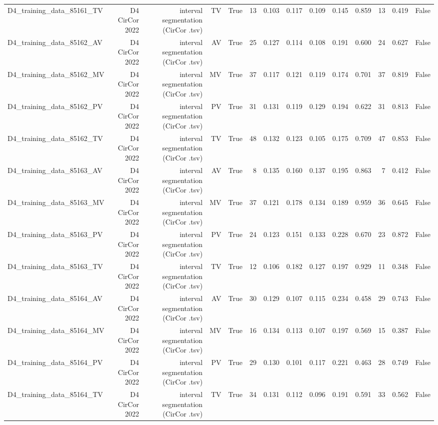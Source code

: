\begin{table}[htbp]
\begin{tabular}{lrrrrrrrrrrrrr}
    D4\_training\_data\_85161\_TV & D4 CirCor 2022 & interval segmentation (CirCor .tsv) & TV & True & 13 & 0.103 & 0.117 & 0.109 & 0.145 & 0.859 & 13 & 0.419 & False \\
    D4\_training\_data\_85162\_AV & D4 CirCor 2022 & interval segmentation (CirCor .tsv) & AV & True & 25 & 0.127 & 0.114 & 0.108 & 0.191 & 0.600 & 24 & 0.627 & False \\
    D4\_training\_data\_85162\_MV & D4 CirCor 2022 & interval segmentation (CirCor .tsv) & MV & True & 37 & 0.117 & 0.121 & 0.119 & 0.174 & 0.701 & 37 & 0.819 & False \\
    D4\_training\_data\_85162\_PV & D4 CirCor 2022 & interval segmentation (CirCor .tsv) & PV & True & 31 & 0.131 & 0.119 & 0.129 & 0.194 & 0.622 & 31 & 0.813 & False \\
    D4\_training\_data\_85162\_TV & D4 CirCor 2022 & interval segmentation (CirCor .tsv) & TV & True & 48 & 0.132 & 0.123 & 0.105 & 0.175 & 0.709 & 47 & 0.853 & False \\
    D4\_training\_data\_85163\_AV & D4 CirCor 2022 & interval segmentation (CirCor .tsv) & AV & True & 8 & 0.135 & 0.160 & 0.137 & 0.195 & 0.863 & 7 & 0.412 & False \\
    D4\_training\_data\_85163\_MV & D4 CirCor 2022 & interval segmentation (CirCor .tsv) & MV & True & 37 & 0.121 & 0.178 & 0.134 & 0.189 & 0.959 & 36 & 0.645 & False \\
    D4\_training\_data\_85163\_PV & D4 CirCor 2022 & interval segmentation (CirCor .tsv) & PV & True & 24 & 0.123 & 0.151 & 0.133 & 0.228 & 0.670 & 23 & 0.872 & False \\
    D4\_training\_data\_85163\_TV & D4 CirCor 2022 & interval segmentation (CirCor .tsv) & TV & True & 12 & 0.106 & 0.182 & 0.127 & 0.197 & 0.929 & 11 & 0.348 & False \\
    D4\_training\_data\_85164\_AV & D4 CirCor 2022 & interval segmentation (CirCor .tsv) & AV & True & 30 & 0.129 & 0.107 & 0.115 & 0.234 & 0.458 & 29 & 0.743 & False \\
    D4\_training\_data\_85164\_MV & D4 CirCor 2022 & interval segmentation (CirCor .tsv) & MV & True & 16 & 0.134 & 0.113 & 0.107 & 0.197 & 0.569 & 15 & 0.387 & False \\
    D4\_training\_data\_85164\_PV & D4 CirCor 2022 & interval segmentation (CirCor .tsv) & PV & True & 29 & 0.130 & 0.101 & 0.117 & 0.221 & 0.463 & 28 & 0.749 & False \\
    D4\_training\_data\_85164\_TV & D4 CirCor 2022 & interval segmentation (CirCor .tsv) & TV & True & 34 & 0.131 & 0.112 & 0.096 & 0.191 & 0.591 & 33 & 0.562 & False \\

\end{tabular}
\end{table}

